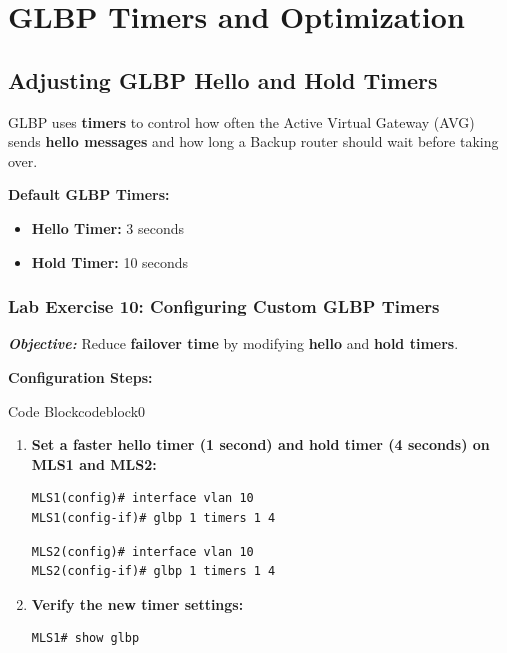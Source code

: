 \documentclass[a4paper]{book}
\begin{document}
\vspace{1em}

\section{GLBP Timers and Optimization}

\subsection{Adjusting GLBP Hello and Hold Timers}
GLBP uses \textbf{timers} to control how often the Active Virtual Gateway (AVG) sends \textbf{hello 
messages} and how long a Backup router should wait before taking over.

\textbf{Default GLBP Timers:}
\begin{itemize}
\item \textbf{Hello Timer:} 3 seconds
\item \textbf{Hold Timer:} 10 seconds
\end{itemize}

\subsubsection{Lab Exercise 10: Configuring Custom GLBP Timers}
\textbf{\textit{Objective:}} Reduce \textbf{failover time} by modifying \textbf{hello} 
and \textbf{hold timers}.
\vspace{1.5em}

\textbf{Configuration Steps:}


\vspace{1.5em}


\begin{ocg}{Code Block}{codeblock}{0}

\vspace{0.5cm}

\begin{enumerate}
\item \textbf{Set a faster hello timer (1 second) and hold timer (4 seconds) on MLS1 and MLS2:}
\begin{lstlisting}
MLS1(config)# interface vlan 10
MLS1(config-if)# glbp 1 timers 1 4
\end{lstlisting}
\begin{lstlisting}
MLS2(config)# interface vlan 10
MLS2(config-if)# glbp 1 timers 1 4
\end{lstlisting}

\item \textbf{Verify the new timer settings:}
\begin{lstlisting}
MLS1# show glbp
\end{lstlisting}
\end{enumerate}
\end{ocg}
\end{document}
